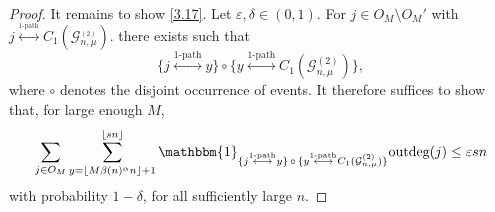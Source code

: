\documentclass[12pt,a4paper]{article}
\newcommand\marginal[1]{\marginpar{\raggedright\parindent=0pt\tiny #1}}
\newcommand{\pmar}[1]{\marginal{\color{red}#1}}
\numberwithin{equation}{section}
\begin{document}
\begin{proof}
 It remains to show \eqref{3.17}. Let $\varepsilon,\delta \in (0,1)$. For $j\in O_M\setminus O_M'$ with $j\overset{_{1\text{-path}}}{\longleftrightarrow}C_1(\mathcal G^{_{(2)}}_{n,\mu})$. 
 there exists  such that 
 $$\{j\overset{1\text{-path}}{\longleftrightarrow}y\} \circ \{y\overset{{1\text{-path}}}{\longleftrightarrow}C_1(\mathcal G^{(2)}_{n, \mu}) \},$$ where $\circ$ denotes the disjoint occurrence 
 of events. It therefore suffices to show that, for large enough $M$, 
\begin{align}\label{3.18}
    \sum_{j\in O_M } \sum_{y=\lfloor M \beta(n)^{\alpha}n\rfloor+1}^{\lfloor sn\rfloor} \mathbbm{1}_{\{j\overset{_{1\text{-path}}}{\longleftrightarrow}y \} \,\circ \,\{y\overset{_{1\text{-path}}}{\longleftrightarrow}C_1(\mathcal G^{(2)}_{n,\mu})\}}\text{outdeg}(j)\le \varepsilon s n
\end{align}
with probability $1-\delta$, for all sufficiently large $n$.
\pagebreak[3]\smallskip


\end{proof}
\end{document}
